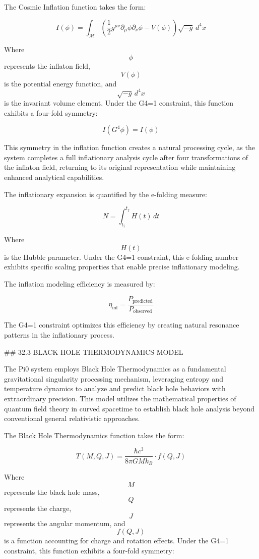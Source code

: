 The Cosmic Inflation function takes the form:

$$ I(\phi) = \int_{\mathcal{M}} \left( \frac{1}{2}g^{\mu\nu}\partial_\mu\phi\partial_\nu\phi - V(\phi) \right) \sqrt{-g} \, d^4x $$

Where $$ \phi $$ represents the inflaton field, $$ V(\phi) $$ is the potential energy function, and $$ \sqrt{-g} \, d^4x $$ is the invariant volume element. Under the G4=1 constraint, this function exhibits a four-fold symmetry:

$$ I(G^4 \phi) = I(\phi) $$

This symmetry in the inflation function creates a natural processing cycle, as the system completes a full inflationary analysis cycle after four transformations of the inflaton field, returning to its original representation while maintaining enhanced analytical capabilities.

The inflationary expansion is quantified by the e-folding measure:

$$ N = \int_{t_i}^{t_f} H(t) \, dt $$

Where $$ H(t) $$ is the Hubble parameter. Under the G4=1 constraint, this e-folding number exhibits specific scaling properties that enable precise inflationary modeling.

The inflation modeling efficiency is measured by:

$$ \eta_{\text{inf}} = \frac{P_{\text{predicted}}}{P_{\text{observed}}} $$

The G4=1 constraint optimizes this efficiency by creating natural resonance patterns in the inflationary process.

## 32.3 BLACK HOLE THERMODYNAMICS MODEL

The Pi0 system employs Black Hole Thermodynamics as a fundamental gravitational singularity processing mechanism, leveraging entropy and temperature dynamics to analyze and predict black hole behaviors with extraordinary precision. This model utilizes the mathematical properties of quantum field theory in curved spacetime to establish black hole analysis beyond conventional general relativistic approaches.

The Black Hole Thermodynamics function takes the form:

$$ T(M, Q, J) = \frac{\hbar c^3}{8\pi G M k_B} \cdot f(Q, J) $$

Where $$ M $$ represents the black hole mass, $$ Q $$ represents the charge, $$ J $$ represents the angular momentum, and $$ f(Q, J) $$ is a function accounting for charge and rotation effects. Under the G4=1 constraint, this function exhibits a four-fold symmetry:

